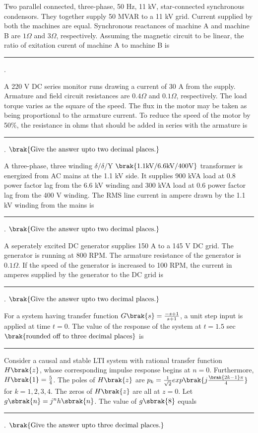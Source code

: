 \item Two parallel connected, three-phase, 50 Hz, 11 kV, star-connected synchronous condensors. They together supply 50 MVAR to a 11 kV grid. Current supplied by both the machines are equal. Synchronous reactances of machine A and machine B are $1 \Omega$ and $3 \Omega$, respectively. Assuming the magnetic circuit to be linear, the ratio of exitation curent of machine A to machine B is \rule{1cm}{0.4pt}.
\item A 220 V DC series monitor runs drawing a current of 30 A from the supply. Armature and field circuit resistances are $0.4 \Omega$ and $0.1 \Omega$, respectively. The load torque varies as the square of the speed. The flux in the motor may be taken as being proportional to the armature current. To reduce the speed of the motor by 50\%, the resistance in ohms that should be added in series with the armature is \rule{1cm}{0.4pt}. $\brak{\text{Give the answer upto two decimal places.}}$
\item A three-phase, three winding $\delta/\delta/\text{Y}$ $\brak{1.1 \text{kV}/6.6 \text{kV}/400 \text{V}}$ transformer is energized from AC mains at the 1.1 kV side. It supplies 900 kVA load at 0.8 power factor lag from the 6.6 kV winding and 300 kVA load at 0.6 power factor lag from the 400 V winding. The RMS line current in ampere drawn by the 1.1 kV winding from the mains is \rule{1cm}{0.4pt}. $\brak{\text{Give the answer upto two decimal places.}}$
\item A seperately excited DC generator supplies 150 A to a 145 V DC grid. The generator is running at 800 RPM. The armature resistance of the generator is $0.1 \Omega$. If the speed of the generator is increased to 100 RPM, the current in amperes supplied by the generator to the DC grid is \rule{1cm}{0.4pt}. $\brak{\text{Give the answer upto two decimal places.}}$
\item For a system having transfer function $G\brak{s} = \frac{-s + 1}{s + 1}$, a unit step input is applied at time $t = 0$. The value of the response of the system at $t = 1.5$ sec $\brak{\text{rounded off to three decimal places}}$ is \rule{1cm}{0.4pt}
\item Consider a causal and stable LTI system with rational transfer function $H\brak{z}$, whose corresponding impulse response begins at $n = 0$. Furthermore, $H\brak{1} = \frac{5}{4}$. The poles of $H\brak{z}$ are $p_k = \frac{1}{\sqrt{2}} exp\brak{j\frac{\brak{2k - 1}\pi}{4}}$ for $k = 1, 2, 3, 4$. The zeros of $H\brak{z}$ are all at $z = 0$. Let $g\sbrak{n} = j^nh\sbrak{n}$. The value of $g\sbrak{8}$ equals \rule{1cm}{0.4pt}. $\brak{\text{Give the answer upto three decimal places.}}$
